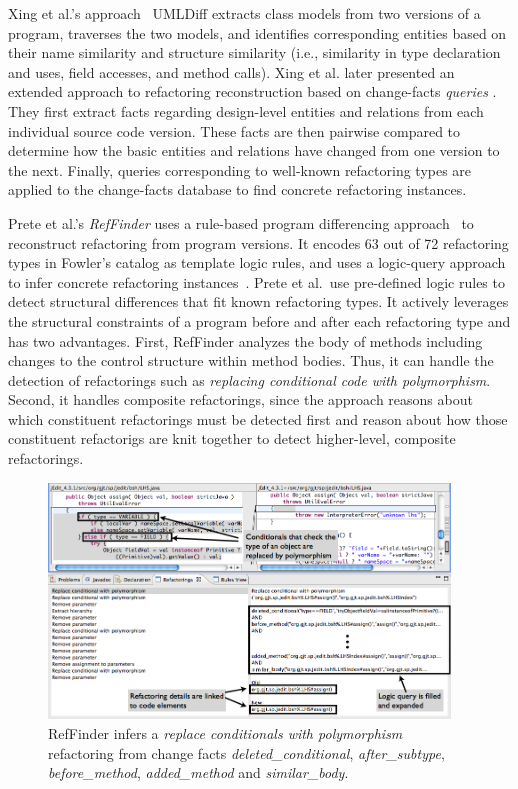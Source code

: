 \documentclass[runningheads,a4paper]{llncs}
\begin{document}
Xing et al.'s approach~\cite{UMLDiff2005} UMLDiff extracts class models from two versions of a program, traverses the two models, and identifies corresponding entities based on their {name similarity} and {structure similarity} {(i.e., similarity in type declaration and uses, field accesses, and method calls)}.
Xing {et al.} later presented an extended approach to refactoring reconstruction based on change-facts {\em queries} \cite{Eleni01}. They first extract facts regarding design-level entities and relations from each individual source code version. These facts are then pairwise compared to determine how the basic entities and relations have changed from one version to the next. Finally, queries corresponding to well-known refactoring types are applied to the change-facts database to find concrete refactoring instances.

Prete et al.'s {\em RefFinder} uses a rule-based program differencing approach~\cite{Prete2010:reffinder,Kim2010:reffinder} to reconstruct refactoring from program versions. It encodes 63 out of 72 refactoring types in Fowler's catalog as template logic rules, and uses a logic-query approach to infer concrete refactoring instances~\cite{Prete2010:reffinder}. Prete et al.~use pre-defined logic rules to detect structural differences that fit known refactoring types. It actively leverages the structural constraints of a program before and after each refactoring type and has two advantages. First, RefFinder analyzes the body of methods including changes to the control structure within method bodies. Thus, it can handle the detection of refactorings such as {\it replacing conditional code with polymorphism}. Second, it handles composite refactorings, since the approach reasons about which constituent refactorings must be detected first and reason about how those constituent refactorigs are knit together to detect higher-level, composite refactorings.

\label{sec:intro} 
\begin{figure}
\centering
\includegraphics[width=0.95\textwidth]{images/reffinder.png}
\caption{RefFinder infers a {\it replace conditionals with polymorphism} refactoring from change facts {\it deleted\_conditional}, {\it after\_subtype}, {\it before\_method}, {\it added\_method} and {\it similar\_body}.\cite{Kim2010:reffinder}}
 \label{fig:reffinderscreenshot}
\end{figure}
\end{document}
